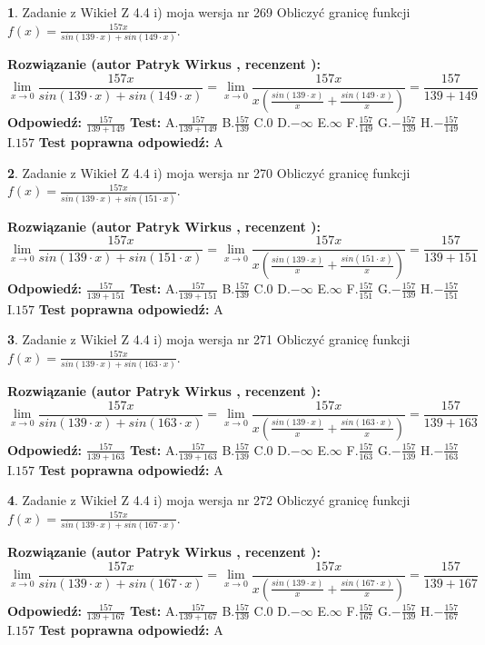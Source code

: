 \documentclass[12pt, a4paper]{article}
\theoremstyle{definition} %
\newtheorem{zad}{}
\newcommand{\zadStart}[1]{\begin{zad}#1\newline}
\newcommand{\zadStop}{\end{zad}}
\newcommand{\rozwStart}[2]{\noindent \textbf{Rozwiązanie (autor #1 , recenzent #2): }\newline}
\newcommand{\rozwStop}{\newline}
\newcommand{\odpStart}{\noindent \textbf{Odpowiedź:}\newline}
\newcommand{\odpStop}{\newline}
\newcommand{\testStart}{\noindent \textbf{Test:}\newline}
\newcommand{\testStop}{\newline}
\newcommand{\kluczStart}{\noindent \textbf{Test poprawna odpowiedź:}\newline}
\newcommand{\kluczStop}{\newline}
\begin{document}
\zadStart{Zadanie z Wikieł Z 4.4 i) moja wersja nr 269}
Obliczyć granicę funkcji $f(x)=\frac{157x}{sin(139\cdot x) +sin(149\cdot x)}$.
\zadStop
\rozwStart{Patryk Wirkus}{}
$$\lim\limits_{x\to 0}\frac{157x}{sin(139\cdot x) +sin(149\cdot x)}=\lim\limits_{x\to 0}\frac{157x}{x(\frac{sin(139\cdot x)}{x}+\frac{sin(149\cdot x)}{x})}=\frac{157}{139+149}$$
\rozwStop
\odpStart
$\frac{157}{139+149}$
\odpStop
\testStart
A.$\frac{157}{139+149}$
B.$\frac{157}{139}$
C.$0$
D.$-\infty$
E.$\infty$
F.$\frac{157}{149}$
G.$-\frac{157}{139}$
H.$-\frac{157}{149}$
I.$157$
\testStop
\kluczStart
A
\kluczStop



\zadStart{Zadanie z Wikieł Z 4.4 i) moja wersja nr 270}
Obliczyć granicę funkcji $f(x)=\frac{157x}{sin(139\cdot x) +sin(151\cdot x)}$.
\zadStop
\rozwStart{Patryk Wirkus}{}
$$\lim\limits_{x\to 0}\frac{157x}{sin(139\cdot x) +sin(151\cdot x)}=\lim\limits_{x\to 0}\frac{157x}{x(\frac{sin(139\cdot x)}{x}+\frac{sin(151\cdot x)}{x})}=\frac{157}{139+151}$$
\rozwStop
\odpStart
$\frac{157}{139+151}$
\odpStop
\testStart
A.$\frac{157}{139+151}$
B.$\frac{157}{139}$
C.$0$
D.$-\infty$
E.$\infty$
F.$\frac{157}{151}$
G.$-\frac{157}{139}$
H.$-\frac{157}{151}$
I.$157$
\testStop
\kluczStart
A
\kluczStop



\zadStart{Zadanie z Wikieł Z 4.4 i) moja wersja nr 271}
Obliczyć granicę funkcji $f(x)=\frac{157x}{sin(139\cdot x) +sin(163\cdot x)}$.
\zadStop
\rozwStart{Patryk Wirkus}{}
$$\lim\limits_{x\to 0}\frac{157x}{sin(139\cdot x) +sin(163\cdot x)}=\lim\limits_{x\to 0}\frac{157x}{x(\frac{sin(139\cdot x)}{x}+\frac{sin(163\cdot x)}{x})}=\frac{157}{139+163}$$
\rozwStop
\odpStart
$\frac{157}{139+163}$
\odpStop
\testStart
A.$\frac{157}{139+163}$
B.$\frac{157}{139}$
C.$0$
D.$-\infty$
E.$\infty$
F.$\frac{157}{163}$
G.$-\frac{157}{139}$
H.$-\frac{157}{163}$
I.$157$
\testStop
\kluczStart
A
\kluczStop



\zadStart{Zadanie z Wikieł Z 4.4 i) moja wersja nr 272}
Obliczyć granicę funkcji $f(x)=\frac{157x}{sin(139\cdot x) +sin(167\cdot x)}$.
\zadStop
\rozwStart{Patryk Wirkus}{}
$$\lim\limits_{x\to 0}\frac{157x}{sin(139\cdot x) +sin(167\cdot x)}=\lim\limits_{x\to 0}\frac{157x}{x(\frac{sin(139\cdot x)}{x}+\frac{sin(167\cdot x)}{x})}=\frac{157}{139+167}$$
\rozwStop
\odpStart
$\frac{157}{139+167}$
\odpStop
\testStart
A.$\frac{157}{139+167}$
B.$\frac{157}{139}$
C.$0$
D.$-\infty$
E.$\infty$
F.$\frac{157}{167}$
G.$-\frac{157}{139}$
H.$-\frac{157}{167}$
I.$157$
\testStop
\kluczStart
A
\kluczStop
\end{document}
